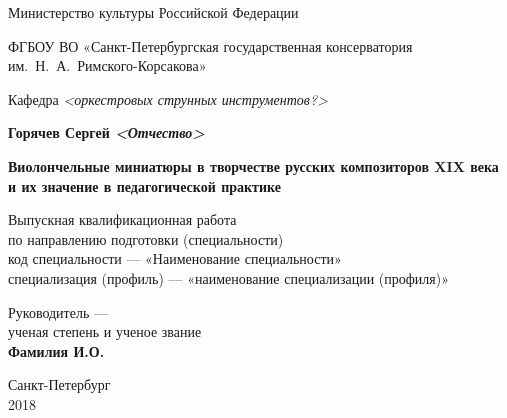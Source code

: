\documentclass[12pt,a4paper,oneside,titlepage,draft]{extreport}
\begin{document}
	
	\begin{titlepage}
		\begin{center}
		
			{Министерство культуры Российской Федерации}		
		
			{ФГБОУ ВО «Санкт-Петербургская государственная консерватория
			им.~Н.~А.~Римского-Корсакова»}
		
			{Кафедра \emph{<оркестровых струнных инструментов?>} }
	
	
		\vfill
		\vfill
		\vfill
				\begin{Large}
				{\textbf{Горячев Сергей \emph{<Отчество>} }}
				\end{Large}
								


		\vfill
		
				{\large {\textbf{Виолончельные миниатюры в творчестве русских композиторов XIX века и их значение в педагогической практике}}}
				
		\vfill
		
				\normalsize
		
				{Выпускная квалификационная работа\\
по направлению подготовки (специальности)\\
код специальности –-- «Наименование специальности»\\
специализация (профиль) --– «наименование специализации (профиля)» }
    		\vfill		
		\vfill		
		\vfill
		\vfill
		\end{center}
		\begin{flushright}
			Руководитель --- \\
			ученая степень и ученое звание \\
			\textbf{Фамилия И.О.}  \\
%		
%		
		\end{flushright}
	\vfill
	\vfill
		\begin{center}
			{Санкт-Петербург \\ 2018}
		\end{center}		
	\end{titlepage}
	
	\tableofcontents
	
\end{document}
